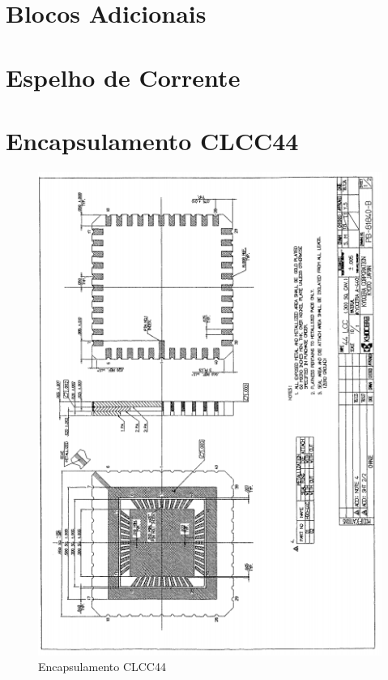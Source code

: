 \chapter{Blocos Adicionais}
\label{blocosadicionais}



\chapter{Espelho de Corrente}


\chapter{Encapsulamento CLCC44}
\label{anexo_clcc4}
\begin{figure}[htb]
 \centering
    \caption{Encapsulamento CLCC44} 
    \includegraphics[scale=0.9]{Anexos/CLC44.png}
\end{figure}